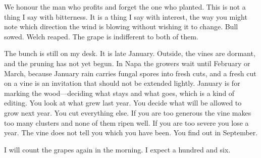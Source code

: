 We honour the man who profits and forget the one who planted. This is not a
thing I say with bitterness. It is a thing I say with interest, the way
you might note which direction the wind is blowing without wishing it to
change. Bull sowed. Welch reaped. The grape is indifferent to both of
them.

The bunch is still on my desk. It is late January. Outside, the vines are
dormant, and the pruning has not yet begun. In Napa the growers wait until
February or March, because January rain carries fungal spores into fresh
cuts, and a fresh cut on a vine is an invitation that should not be
extended lightly. January is for marking the wood---deciding what stays and
what goes, which is a kind of editing. You look at what grew last year. You
decide what will be allowed to grow next year. You cut everything else. If
you are too generous the vine makes too many clusters and none of them
ripen well. If you are too severe you lose a year. The vine does not tell
you which you have been. You find out in September.

I will count the grapes again in the morning. I expect a hundred and six.
